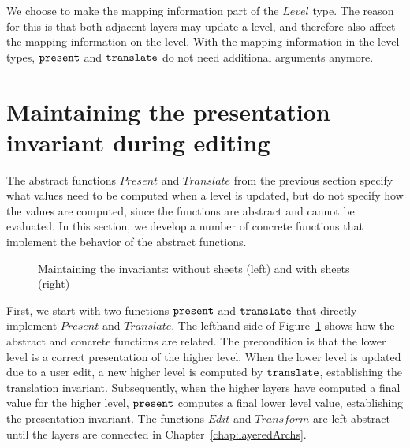 

We choose to make the mapping information part of the $Level$ type. The reason for this is that both adjacent layers may update a level, and therefore also affect the mapping information on the level.  With the mapping information in the level types, ${\tt present}$ and ${\tt translate}$ do not need additional arguments anymore.
\ec



%																
%																
%																
\section{Maintaining the presentation invariant during editing}   \label{sect:maintainingInv}

The abstract functions $Present$ and $Translate$ from the previous section specify what values need to be computed when a level is updated, but do not specify how the values are computed, since the functions are abstract and cannot be evaluated. In this section, we develop a number of concrete  functions that implement the behavior of the abstract functions.

\begin{figure}
\begin{center}
\begin{center}
 
\end{center}
\caption{Maintaining the invariants: without sheets (left) and with sheets (right)}\label{maintainingInvs} 
\end{center}
\end{figure}

First, we start with two functions ${\tt present}$ and ${\tt translate}$ that directly implement $Present$ and $Translate$. The lefthand side of Figure~\ref{maintainingInvs} shows how the abstract and concrete functions are related. The precondition is that the lower level is a correct presentation of the higher level. When the lower level is updated due to a user edit, a new higher level is computed by ${\tt translate}$, establishing the translation invariant. Subsequently, when the higher layers have computed a final value for the higher level, ${\tt present}$ computes a final lower level value, establishing the presentation invariant. The functions $Edit$ and $Transform$ are left abstract until the layers are connected in Chapter~\ref{chap:layeredArchs}.

